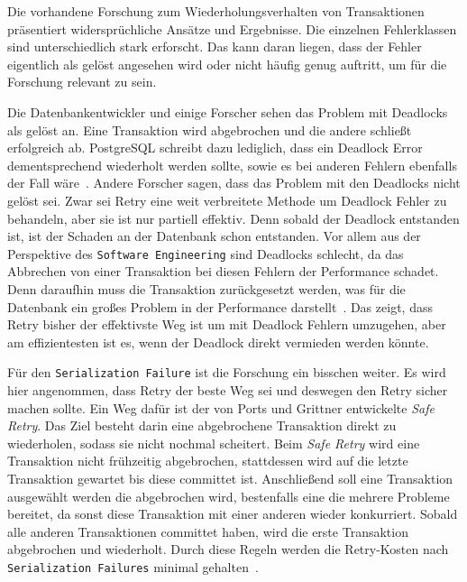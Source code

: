 
Die vorhandene Forschung zum Wiederholungsverhalten von Transaktionen präsentiert widersprüchliche Ansätze
und Ergebnisse.
Die einzelnen Fehlerklassen sind unterschiedlich stark erforscht.
Das kann daran liegen, dass der Fehler eigentlich als gelöst angesehen wird oder nicht häufig genug auftritt,
um für die Forschung relevant zu sein.

Die Datenbankentwickler und einige Forscher sehen das Problem mit Deadlocks als gelöst an.
Eine Transaktion wird abgebrochen und die andere schließt erfolgreich ab.
PostgreSQL schreibt dazu lediglich, dass ein Deadlock Error dementsprechend wiederholt werden sollte, sowie es bei
anderen Fehlern ebenfalls der Fall wäre~\cite{PostgreSQLSerializationFailures}.
Andere Forscher sagen, dass das Problem mit den Deadlocks nicht gelöst sei.
Zwar sei Retry eine weit verbreitete Methode um Deadlock Fehler zu behandeln, aber sie ist nur partiell effektiv.
Denn sobald der Deadlock entstanden ist, ist der Schaden an der Datenbank schon entstanden.
Vor allem aus der Perspektive des \texttt{Software Engineering} sind Deadlocks schlecht, da das Abbrechen von einer
Transaktion bei diesen Fehlern der Performance schadet.
Denn daraufhin muss die Transaktion zurückgesetzt werden, was für die Datenbank ein großes Problem in der
Performance darstellt~\cite{Grechanik2013Deadlocks}.
Das zeigt, dass Retry bisher der effektivste Weg ist um mit Deadlock Fehlern umzugehen, aber am effizientesten ist es,
wenn der Deadlock direkt vermieden werden könnte.

Für den \texttt{Serialization Failure} ist die Forschung ein bisschen weiter.
Es wird hier angenommen, dass Retry der beste Weg sei und deswegen den Retry sicher machen sollte.
Ein Weg dafür ist der von Ports und Grittner entwickelte \emph{Safe Retry}.
Das Ziel besteht darin eine abgebrochene Transaktion direkt zu wiederholen, sodass sie nicht nochmal scheitert.
Beim \emph{Safe Retry} wird eine Transaktion nicht frühzeitig abgebrochen, stattdessen wird auf die letzte Transaktion
gewartet bis diese committet ist.
Anschließend soll eine Transaktion ausgewählt werden die abgebrochen wird, bestenfalls eine die mehrere Probleme
bereitet, da sonst diese Transaktion mit einer anderen wieder konkurriert.
Sobald alle anderen Transaktionen committet haben, wird die erste Transaktion abgebrochen und wiederholt.
Durch diese Regeln werden die Retry-Kosten nach \texttt{Serialization Failures} minimal gehalten~\cite{Ports2012SerializableSnapshot}.

